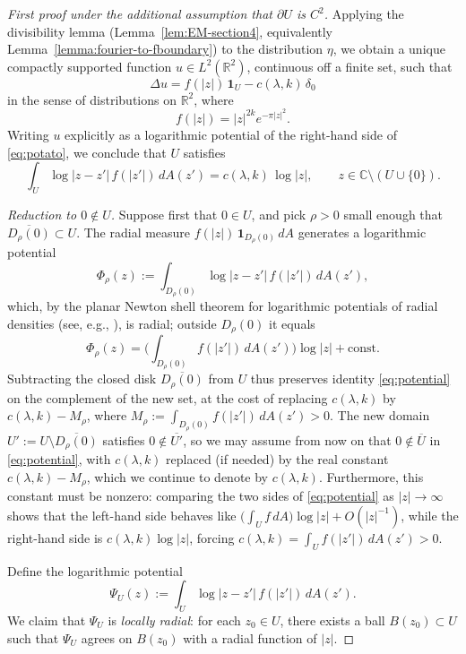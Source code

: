 \documentclass[a4paper,11pt,reqno]{amsart}
\numberwithin{equation}{section}
\theoremstyle{plain} %
\theoremstyle{definition} %
\theoremstyle{remark}
\newcommand{\R}{\mathbb{R}}
\newcommand{\C}{\mathbb{C}}
\begin{document}
\begin{proof}[First proof under the additional assumption that $\partial U$ is $C^2$]
Applying the divisibility lemma (Lemma~\ref{lem:EM-section4}, equivalently
Lemma~\ref{lemma:fourier-to-fboundary}) to the distribution $\eta$, we
obtain a unique compactly supported function $u\in L^2(\R^2)$, continuous
off a finite set, such that
\begin{equation}\label{eq:potato}
\Delta u=f(|z|)\,\mathbf{1}_U-c(\lambda,k)\,\delta_0
\end{equation}
in the sense of distributions on $\R^2$, where
\[
f(|z|)=|z|^{2k}e^{-\pi |z|^2}.
\]
Writing $u$ explicitly as a logarithmic potential of the right-hand side
of \eqref{eq:potato}, we conclude that $U$ satisfies
\begin{equation}\label{eq:potential}
\int_U \log|z-z'|\, f(|z'|)\,dA(z')
=c(\lambda,k)\,\log|z|,
\qquad z\in \C\setminus (U\cup\{0\}).
\end{equation}

\medskip

\noindent\emph{Reduction to $0\notin U$.}\quad
Suppose first that $0\in U$, and pick $\rho>0$ small enough that
$\overline{D_\rho(0)}\subset U$. The radial measure
$f(|z|)\,\mathbf{1}_{D_\rho(0)}\,dA$ generates a logarithmic potential
\[
\Phi_\rho(z):=\int_{D_\rho(0)} \log|z-z'|\, f(|z'|)\,dA(z'),
\]
which, by the planar Newton shell theorem for logarithmic potentials of
radial densities (see, e.g., \cite[Ch.~2]{Isakov}), is radial; outside
$D_\rho(0)$ it equals
\[
\Phi_\rho(z)=\Big(\int_{D_\rho(0)}f(|z'|)\,dA(z')\Big)\log|z|+\text{const}.
\]
Subtracting the closed disk $\overline{D_\rho(0)}$ from $U$ thus preserves
identity \eqref{eq:potential} on the complement of the new set, at the
cost of replacing $c(\lambda,k)$ by $c(\lambda,k)-M_\rho$, where
$M_\rho:=\int_{D_\rho(0)}f(|z'|)\,dA(z')>0$. The new domain
$U':=U\setminus\overline{D_\rho(0)}$ satisfies
$0\notin \overline{U'}$, so we may assume from now on that
$0\notin \overline{U}$ in \eqref{eq:potential}, with $c(\lambda,k)$
replaced (if needed) by the real constant $c(\lambda,k)-M_\rho$, which
we continue to denote by $c(\lambda,k)$. Furthermore, this constant must
be nonzero: comparing the two sides of \eqref{eq:potential} as
$|z|\to\infty$ shows that the left-hand side behaves like
$\big(\int_U f\,dA\big)\log|z|+O(|z|^{-1})$, while the right-hand side
is $c(\lambda,k)\log|z|$, forcing
$c(\lambda,k)=\int_U f(|z'|)\,dA(z')>0$.

\medskip

Define the logarithmic potential
\[
\Psi_U(z):=\int_U \log|z-z'|\, f(|z'|)\,dA(z').
\]
We claim that $\Psi_U$ is \emph{locally radial}: for each $z_0\in U$,
there exists a ball $B(z_0)\subset U$ such that $\Psi_U$ agrees on
$B(z_0)$ with a radial function of $|z|$.


\end{proof}
\end{document}
